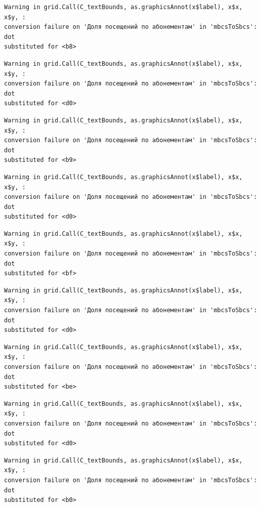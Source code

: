 \documentclass[
  letterpaper,
  DIV=11,
  numbers=noendperiod]{scrartcl}
\begin{document}
\begin{verbatim}
Warning in grid.Call(C_textBounds, as.graphicsAnnot(x$label), x$x, x$y, :
conversion failure on 'Доля посещений по абонементам' in 'mbcsToSbcs': dot
substituted for <b8>
\end{verbatim}

\begin{verbatim}
Warning in grid.Call(C_textBounds, as.graphicsAnnot(x$label), x$x, x$y, :
conversion failure on 'Доля посещений по абонементам' in 'mbcsToSbcs': dot
substituted for <d0>
\end{verbatim}

\begin{verbatim}
Warning in grid.Call(C_textBounds, as.graphicsAnnot(x$label), x$x, x$y, :
conversion failure on 'Доля посещений по абонементам' in 'mbcsToSbcs': dot
substituted for <b9>
\end{verbatim}

\begin{verbatim}
Warning in grid.Call(C_textBounds, as.graphicsAnnot(x$label), x$x, x$y, :
conversion failure on 'Доля посещений по абонементам' in 'mbcsToSbcs': dot
substituted for <d0>
\end{verbatim}

\begin{verbatim}
Warning in grid.Call(C_textBounds, as.graphicsAnnot(x$label), x$x, x$y, :
conversion failure on 'Доля посещений по абонементам' in 'mbcsToSbcs': dot
substituted for <bf>
\end{verbatim}

\begin{verbatim}
Warning in grid.Call(C_textBounds, as.graphicsAnnot(x$label), x$x, x$y, :
conversion failure on 'Доля посещений по абонементам' in 'mbcsToSbcs': dot
substituted for <d0>
\end{verbatim}

\begin{verbatim}
Warning in grid.Call(C_textBounds, as.graphicsAnnot(x$label), x$x, x$y, :
conversion failure on 'Доля посещений по абонементам' in 'mbcsToSbcs': dot
substituted for <be>
\end{verbatim}

\begin{verbatim}
Warning in grid.Call(C_textBounds, as.graphicsAnnot(x$label), x$x, x$y, :
conversion failure on 'Доля посещений по абонементам' in 'mbcsToSbcs': dot
substituted for <d0>
\end{verbatim}

\begin{verbatim}
Warning in grid.Call(C_textBounds, as.graphicsAnnot(x$label), x$x, x$y, :
conversion failure on 'Доля посещений по абонементам' in 'mbcsToSbcs': dot
substituted for <b0>
\end{verbatim}
\end{document}
